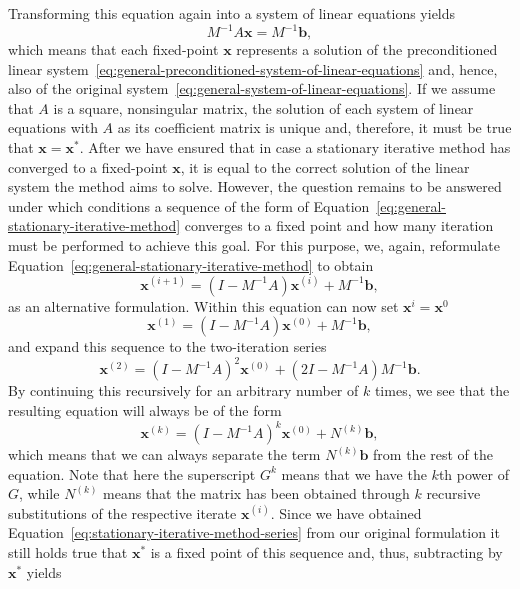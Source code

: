 Transforming this equation again into a system of linear equations yields
\begin{equation*}
	M^{-1} A \bm{x} = M^{-1}\bm b,
\end{equation*}
which means that each fixed-point $\bm{x}$ represents a solution of the preconditioned linear system~\eqref{eq:general-preconditioned-system-of-linear-equations} and, hence, also of the original system~\eqref{eq:general-system-of-linear-equations}.
If we assume that $A$ is a square, nonsingular matrix, the solution of each system of linear equations with $A$ as its coefficient matrix is unique and, therefore, it must be true that $\bm{x} = \bm{x}^{*}$.
After we have ensured that in case a stationary iterative method has converged to a fixed-point $\bm{x}$, it is equal to the correct solution of the linear system the method aims to solve.
However, the question remains to be answered under which conditions a sequence of the form of Equation~\eqref{eq:general-stationary-iterative-method} converges to a fixed point and how many iteration must be performed to achieve this goal.
For this purpose, we, again, reformulate Equation~\eqref{eq:general-stationary-iterative-method} to obtain
\begin{equation}
	\bm{x}^{(i+1)} = (I - M^{-1} A) \bm{x}^{(i)} + M^{-1}\bm b,
\end{equation}
as an alternative formulation.
Within this equation can now set $\bm{x}^{i} = \bm{x}^{0}$ 
\begin{equation}
	\bm{x}^{(1)} = (I - M^{-1} A) \bm{x}^{(0)} + M^{-1}\bm b,
\end{equation}
and expand this sequence to the two-iteration series
\begin{equation}
	\bm{x}^{(2)} = (I - M^{-1} A)^2 \bm{x}^{(0)} + (2I - M^{-1} A)M^{-1} \bm{b}.
\end{equation}
By continuing this recursively for an arbitrary number of $k$ times, we see that the resulting equation will always be of the form
\begin{equation}
	\bm{x}^{(k)} = (I - M^{-1} A)^k \bm{x}^{(0)} + N^{(k)}\bm{b},
	\label{eq:stationary-iterative-method-series}
\end{equation}
which means that we can always separate the term $N^{(k)}\bm{b}$ from the rest of the equation.
Note that here the superscript $G^k$ means that we have the $k$th power of $G$, while $N^{(k)}$ means that the matrix has been obtained through $k$ recursive substitutions of the respective iterate $\bm{x}^{(i)}$.
Since we have obtained Equation~\eqref{eq:stationary-iterative-method-series} from our original formulation it still holds true that $\bm{x}^{*}$ is a fixed point of this sequence and, thus, subtracting by $\bm{x}^{*}$ yields
